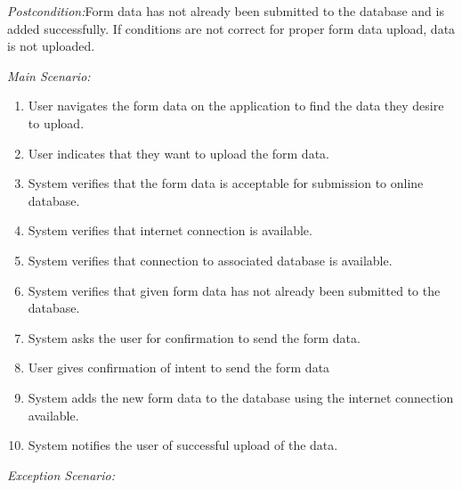 \documentclass[twoside,letterpaper]{article}
\begin{document}
{\color{black} \textit{Postcondition:}Form data has not already been submitted to the database and is added successfully. If conditions are not correct for proper form data upload, data is not uploaded.}
\newline

{\color{black} \textit{Main Scenario:}}
\begin{enumerate}
\item User navigates the form data on the application to find the data they desire to upload.
\item User indicates that they want to upload the form data.
\item System verifies that the form data is acceptable for submission to online database.
\item System verifies that internet connection is available.
\item System verifies that connection to associated database is available.
\item System verifies that given form data has not already been submitted to the database.
\item System asks the user for confirmation to send the form data.
\item User gives confirmation of intent to send the form data
\item System adds the new form data to the database using the internet connection available.
\item System notifies the user of successful upload of the data.
\end{enumerate}

{\color{black} \textit{Exception Scenario:}}
\end{document}
